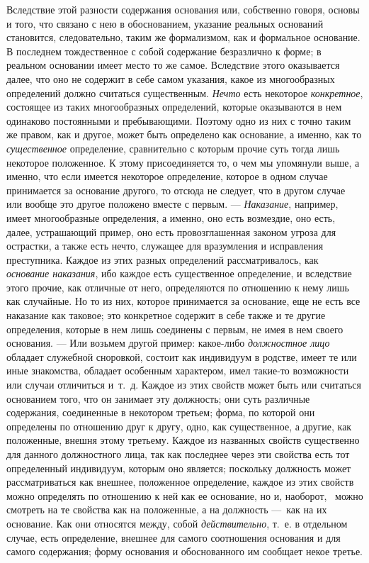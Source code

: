 Вследствие этой разности содержания основания или, собственно говоря, основы
и того, что связано с нею в обоснованием, указание реальных оснований
становится, следовательно, таким же формализмом, как и формальное
основание. В последнем тождественное с собой содержание безразлично к
форме; в реальном основании имеет место то же самое. Вследствие этого
оказывается далее, что оно не содержит в себе самом указания, какое из
многообразных определений должно считаться существенным.
{\em Нечто} есть некоторое
{\em конкретное}, состоящее из таких многообразных
определений, которые оказываются в нем одинаково постоянными и
пребывающими. Поэтому одно из них с точно таким же правом, как и другое,
может быть определено как основание, а именно, как то
{\em существенное} определение, сравнительно с которым
прочие суть тогда лишь некоторое положенное. К этому присоединяется то, о
чем мы упомянули выше, а именно, что если имеется некоторое определение,
которое в одном случае принимается за основание другого, то отсюда не
следует, что в другом случае или вообще это другое положено вместе с
первым. — {\em Наказание}, например, имеет
многообразные определения, а именно, оно есть возмездие, оно есть, далее,
устрашающий пример, оно есть провозглашенная законом угроза для острастки,
а также есть нечто, служащее для вразумления и исправления преступника.
Каждое из этих разных определений рассматривалось, как
{\em основание наказания}, ибо каждое есть существенное
определение, и вследствие этого прочие, как отличные от него, определяются
по отношению к нему лишь как случайные. Но то из них, которое принимается
за основание, еще не есть все наказание как таковое; это конкретное
содержит в себе также и те другие определения, которые в нем лишь соединены
с первым, не имея в нем своего основания. — Или возьмем другой пример:
какое-либо {\em должностное лицо} обладает служебной
сноровкой, состоит как индивидуум в родстве, имеет те или иные знакомства,
обладает особенным характером, имел такие-то возможности или случаи
отличиться и~т.~д. Каждое из этих свойств может быть или считаться
основанием того, что он занимает эту должность; они суть различные
содержания, соединенные в некотором третьем; форма, по которой они
определены по отношению друг к другу, одно, как существенное, а другие, как
положенные, внешня этому третьему. Каждое из названных свойств существенно
для данного должностного лица, так как последнее через эти свойства есть
тот определенный индивидуум, которым оно является; поскольку должность
может рассматриваться как внешнее, положенное определение, каждое из этих
свойств можно определять по отношению к ней как ее основание, но и,
наоборот, \ можно смотреть на те свойства как на положенные, а на должность
—~как на их основание. Как они относятся между, собой
{\em действительно}, т.~е. в отдельном случае, есть
определение, внешнее для самого соотношения основания и для самого
содержания; форму основания и обоснованного им сообщает некое третье.

